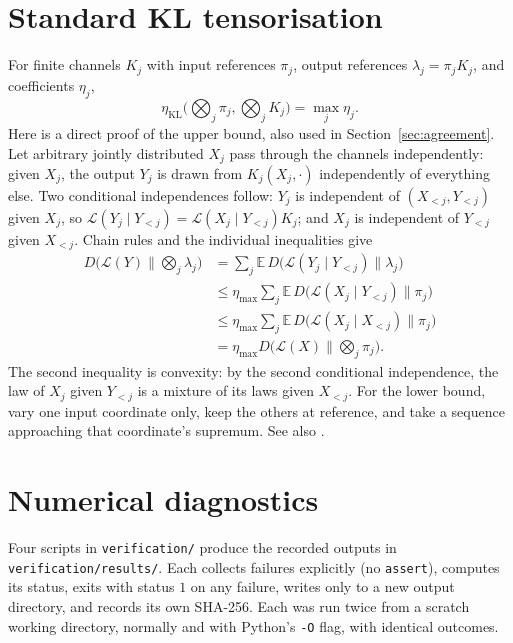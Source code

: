 \documentclass[11pt,a4paper]{article}
\numberwithin{equation}{section}
\theoremstyle{definition}
\theoremstyle{remark}
\newcommand{\KL}{D}
\newcommand{\E}{\mathbb E}
\newcommand{\etaKL}{\eta_{\mathrm{KL}}}
\begin{document}
\section{Standard KL tensorisation}\label{app:products}

For finite channels \(K_j\) with input references \(\pi_j\), output
references \(\lambda_j=\pi_jK_j\), and coefficients \(\eta_j\),
\[
\etaKL\Big(\bigotimes_j\pi_j,\bigotimes_jK_j\Big)=\max_j\eta_j .
\]
Here is a direct proof of the upper bound, also used in
Section~\ref{sec:agreement}. Let arbitrary jointly distributed \(X_j\) pass
through the channels independently: given \(X_j\), the output \(Y_j\) is
drawn from \(K_j(X_j,\cdot)\) independently of everything else. Two
conditional independences follow: \(Y_j\) is independent of
\((X_{<j},Y_{<j})\) given \(X_j\), so
\(\mathcal L(Y_j\mid Y_{<j})=\mathcal L(X_j\mid Y_{<j})K_j\); and \(X_j\) is
independent of \(Y_{<j}\) given \(X_{<j}\). Chain rules and the individual
inequalities give
\begin{align*}
\KL\big(\mathcal L(Y)\big\|\textstyle\bigotimes_j\lambda_j\big)
&=\sum_j\E\,\KL\big(\mathcal L(Y_j\mid Y_{<j})\big\|\lambda_j\big)\\
&\le\eta_{\max}\sum_j\E\,\KL\big(\mathcal L(X_j\mid Y_{<j})\big\|\pi_j\big)\\
&\le\eta_{\max}\sum_j\E\,\KL\big(\mathcal L(X_j\mid X_{<j})\big\|\pi_j\big)\\
&=\eta_{\max}\KL\big(\mathcal L(X)\big\|\textstyle\bigotimes_j\pi_j\big).
\end{align*}
The second inequality is convexity: by the second conditional independence,
the law of \(X_j\) given \(Y_{<j}\) is a mixture of its laws given
\(X_{<j}\). For the lower bound, vary one input coordinate only, keep the
others at reference, and take a sequence approaching that coordinate's
supremum. See also \cite{raginsky,polyanskiywu}.

\section{Numerical diagnostics}\label{app:numerics}

Four scripts in \texttt{verification/} produce the recorded outputs in
\texttt{verification/results/}. Each collects failures explicitly (no
\texttt{assert}), computes its status, exits with status \(1\) on any
failure, writes only to a new output directory, and records its own SHA-256.
Each was run twice from a scratch working directory, normally and with
Python's \texttt{-O} flag, with identical outcomes.
\end{document}
